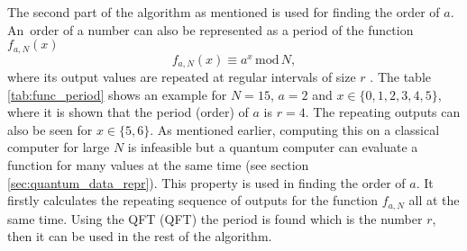 The second part of the algorithm as mentioned is used for finding the order of $a$. An~order of a number can also be represented as a period of the function $f_{a,N}(x)$
\begin{equation}
  f_{a,N}(x)\equiv a^x\,\mathrm{mod}\,N,
\end{equation}
where its output values are repeated at regular intervals of size $r$ \cite{Yanofsky2008}. The table \ref{tab:func_period} shows an example for $N=15$, $a=2$ and $x\in\{0,1,2,3,4,5\}$, where it is shown that the period (order) of $a$ is $r=4$. The repeating outputs can also be seen for $x\in\{5,6\}$. As mentioned earlier, computing this on a classical computer for large $N$ is infeasible but a quantum computer can evaluate a function for many values at the same time (see section \ref{sec:quantum_data_repr}). This property is used in finding the order of $a$. It firstly calculates the repeating sequence of outputs for the function $f_{a,N}$ all at the same time. Using the QFT (\acl{QFT}) the period is found which is the number $r$, then it can be used in the rest of the algorithm. \cite{McMahon2008}

